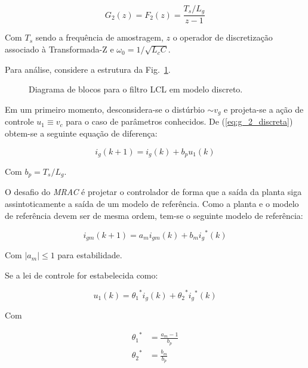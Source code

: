     \begin{equation}
        G_2(z) = F_2(z) = \frac{T_s / L_g}{z - 1}
        \label{eq:g_2_discreta}
    \end{equation}

    Com $T_s$ sendo a frequência de amostragem, $z$ o operador de discretização
    associado à Transformada-Z e $\omega_0 = 1 / \sqrt{L_c C}$.

    Para análise, considere a estrutura da Fig.~\ref{fig:LCL_discreto}.

    \begin{figure}[htb]
        \centering{
            }%
        \renewcommand\figurename{Fig.}
        \caption{Diagrama de blocos para o filtro LCL em modelo discreto.}
        \label{fig:LCL_discreto}
    \end{figure}

    Em um primeiro momento, desconsidera-se o distúrbio $\sim$$v_g$ e projeta-se
    a ação de controle $u_1 \equiv v_c$ para o caso de parâmetros conhecidos. De
    (\ref{eq:g_2_discreta}) obtem-se a seguinte equação de diferença:

    \begin{equation}
        i_g (k + 1) = i_g (k) + b_p u_1 (k)
        \label{eq:diferenca}
    \end{equation}

    Com $b_p = T_s / L_g$.

    O desafio do \textit{MRAC} é projetar o controlador de forma que a saída da
    planta siga assintoticamente a saída de um modelo de referência. Como a planta
    e o modelo de referência devem ser de mesma ordem, tem-se o seguinte modelo
    de referência:

    \begin{equation}
        i_{gm} (k + 1) = a_m i_{gm} (k) + b_m {i_g}^* (k)
        \label{eq:modelo_referencia}
    \end{equation}

    Com $| a_m | \le 1$ para estabilidade.

    Se a lei de controle for estabelecida como:

    \begin{equation}
        u_1 (k) = {\theta_1}^* i_g (k) + {\theta_2}^* {i_g}^* (k)
    \end{equation}

    Com

    \begin{subequations}
        \label{eq:ganhos}
        \begin{align}
            {\theta_1}^* & = \frac{a_m - 1}{b_p} \\
            {\theta_2}^* & = \frac{b_m}{b_p}
        \end{align}
    \end{subequations}

